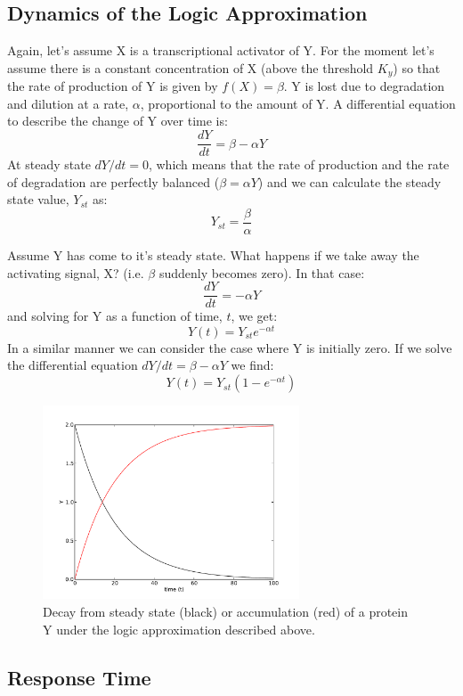 \documentclass[11pt,letterpaper,oneside,pagesize]{scrartcl}
\begin{document}
\subsection{Dynamics of the Logic Approximation}

Again, let's assume X is a transcriptional activator of Y. For the moment let's assume there is a constant concentration of X (above the threshold $K_y$) so that the rate of production of Y is given by $f(X) = \beta$. Y is lost due to degradation and dilution at a rate, $\alpha$, proportional to the amount of Y. A differential equation to describe the change of Y over time is:
\[
\frac{dY}{dt} = \beta - \alpha Y
\]
At steady state $dY/dt = 0$, which means that the rate of production and the rate of degradation are perfectly balanced ($\beta = \alpha Y$) and we can calculate the steady state value, $Y_{st}$ as:
\[
Y_{st} = \frac{\beta}{\alpha}
\]

Assume Y has come to it's steady state. What happens if we take away the activating signal, X? (i.e. $\beta$ suddenly becomes zero). In that case:
\[
\frac{dY}{dt} = -\alpha Y
\]
and solving for Y as a function of time, $t$, we get:
\[
Y(t) = Y_{st}e^{-\alpha t}
\]
In a similar manner we can consider the case where Y is initially zero. If we solve the differential equation $dY/dt = \beta - \alpha Y$ we find:
\[
Y(t) = Y_{st}(1 - e^{-\alpha t})
\]

\begin{figure}[lht]
\centering
 \includegraphics[width=3in]{yst_decayred_accumulateblack_alpha05.pdf}
 \caption{Decay from steady state (black) or accumulation (red) of a protein Y under the logic approximation described above.}
\label{fig:decayaccumulate}
\end{figure}


\subsection{Response Time}
\end{document}
